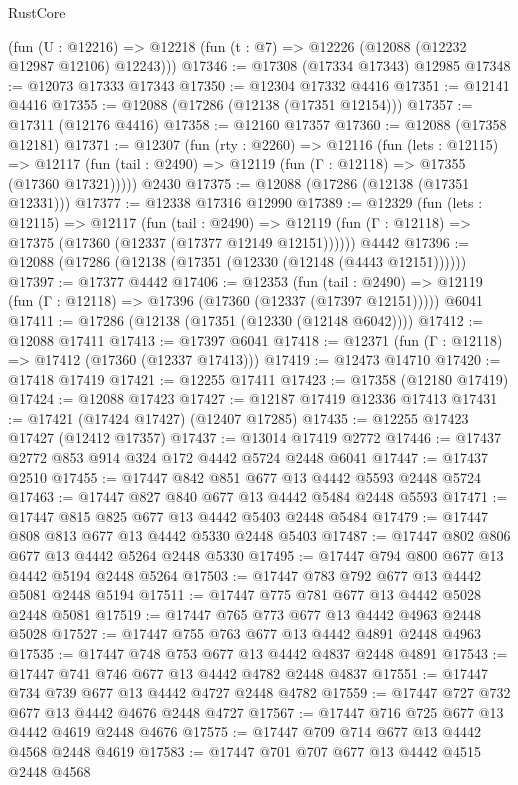 \begin{lexlean}{RustCore}
\begin{coremodule}
    (fun (U : @12216) => @12218 (fun (t : @7) => @12226 (@12088 (@12232 @12987 @12106) @12243)))
@17346 := @17308 (@17334 @17343) @12985
@17348 := @12073 @17333 @17343
@17350 := @12304 @17332 @4416
@17351 := @12141 @4416
@17355 := @12088 (@17286 (@12138 (@17351 @12154)))
@17357 := @17311 (@12176 @4416)
@17358 := @12160 @17357
@17360 := @12088 (@17358 @12181)
@17371 := @12307
    (fun (rty : @2260) =>
    @12116
      (fun (lets : @12115) =>
      @12117 (fun (tail : @2490) => @12119 (fun (Γ : @12118) => @17355 (@17360 @17321)))))
    @2430
@17375 := @12088 (@17286 (@12138 (@17351 @12331)))
@17377 := @12338 @17316 @12990
@17389 := @12329
    (fun (lets : @12115) =>
    @12117
      (fun (tail : @2490) =>
      @12119 (fun (Γ : @12118) => @17375 (@17360 (@12337 (@17377 @12149 @12151))))))
    @4442
@17396 := @12088 (@17286 (@12138 (@17351 (@12330 (@12148 (@4443 @12151))))))
@17397 := @17377 @4442
@17406 := @12353
    (fun (tail : @2490) => @12119 (fun (Γ : @12118) => @17396 (@17360 (@12337 (@17397 @12151)))))
    @6041
@17411 := @17286 (@12138 (@17351 (@12330 (@12148 @6042))))
@17412 := @12088 @17411
@17413 := @17397 @6041
@17418 := @12371 (fun (Γ : @12118) => @17412 (@17360 (@12337 @17413)))
@17419 := @12473 @14710
@17420 := @17418 @17419
@17421 := @12255 @17411
@17423 := @17358 (@12180 @17419)
@17424 := @12088 @17423
@17427 := @12187 @17419 @12336 @17413
@17431 := @17421 (@17424 @17427) (@12407 @17285)
@17435 := @12255 @17423 @17427 (@12412 @17357)
@17437 := @13014 @17419 @2772
@17446 := @17437 @2772 @853 @914 @324 @172 @4442 @5724 @2448 @6041
@17447 := @17437 @2510
@17455 := @17447 @842 @851 @677 @13 @4442 @5593 @2448 @5724
@17463 := @17447 @827 @840 @677 @13 @4442 @5484 @2448 @5593
@17471 := @17447 @815 @825 @677 @13 @4442 @5403 @2448 @5484
@17479 := @17447 @808 @813 @677 @13 @4442 @5330 @2448 @5403
@17487 := @17447 @802 @806 @677 @13 @4442 @5264 @2448 @5330
@17495 := @17447 @794 @800 @677 @13 @4442 @5194 @2448 @5264
@17503 := @17447 @783 @792 @677 @13 @4442 @5081 @2448 @5194
@17511 := @17447 @775 @781 @677 @13 @4442 @5028 @2448 @5081
@17519 := @17447 @765 @773 @677 @13 @4442 @4963 @2448 @5028
@17527 := @17447 @755 @763 @677 @13 @4442 @4891 @2448 @4963
@17535 := @17447 @748 @753 @677 @13 @4442 @4837 @2448 @4891
@17543 := @17447 @741 @746 @677 @13 @4442 @4782 @2448 @4837
@17551 := @17447 @734 @739 @677 @13 @4442 @4727 @2448 @4782
@17559 := @17447 @727 @732 @677 @13 @4442 @4676 @2448 @4727
@17567 := @17447 @716 @725 @677 @13 @4442 @4619 @2448 @4676
@17575 := @17447 @709 @714 @677 @13 @4442 @4568 @2448 @4619
@17583 := @17447 @701 @707 @677 @13 @4442 @4515 @2448 @4568

\end{coremodule}
\end{lexlean}
